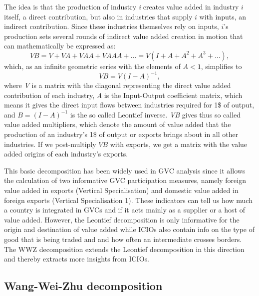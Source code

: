 \documentclass[11pt,a4paper]{article}
\begin{document}
The idea is that the production of industry \textit{i} creates value added in industry $i$ itself, a direct contribution, but also in industries that supply $i$ with inputs, an indirect contribution. Since these industries themselves rely on inputs, $i$'s production sets several rounds of indirect value added creation in motion that can mathematically be expressed as:
\begin{equation}
VB = V + VA + VAA + VAAA + ... = V (I+A+A^{2}+A^{3}+...),
\end{equation}
which, as an infinite geometric series with the elements of $A<1$, simplifies to
\begin{equation}
VB = V (I-A)^{-1},
\end{equation}
where \textit{V} is a matrix with the diagonal representing the direct value added contribution of each industry, \textit{A} is the Input-Output coefficient matrix, which means it gives the direct input flows between industries required for 1\$ of output, and $B = (I-A)^{-1}$ is the so called Leontief inverse. \textit{VB} gives thus so called value added multipliers, which denote the amount of value added that the production of an industry's 1\$ of output or exports brings about in all other industries. If we post-multiply $VB$ with exports, we get a matrix with the value added origins of each industry's exports.
 
This basic decomposition has been widely used in GVC analysis since it allows the calculation of two informative GVC participation measures, namely foreign value added in exports (Vertical Specialisation) and domestic value added in foreign exports (Vertical Specialisation 1). These indicators can tell us how much a country is integrated in GVCs and if it acts mainly as a supplier or a host of value added. However, the Leontief decomposition is only informative for the origin and destination of value added while ICIOs also contain info on the type of good that is being traded and and how often an intermediate crosses borders. The WWZ decomposition extends the Leontief decomposition in this direction and thereby extracts more insights from ICIOs.


\subsection{Wang-Wei-Zhu decomposition}\label{sub:wwz}
\end{document}
